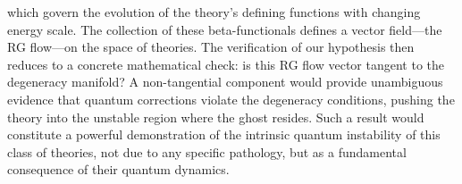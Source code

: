 \documentclass[twocolumn]{aastex631}
\begin{document}
which govern the evolution of the theory's defining functions with changing energy scale. The collection of these beta-functionals defines a vector field---the RG flow---on the space of theories. The verification of our hypothesis then reduces to a concrete mathematical check: is this RG flow vector tangent to the degeneracy manifold? A non-tangential component would provide unambiguous evidence that quantum corrections violate the degeneracy conditions, pushing the theory into the unstable region where the ghost resides. Such a result would constitute a powerful demonstration of the intrinsic quantum instability of this class of theories, not due to any specific pathology, but as a fundamental consequence of their quantum dynamics.
\end{document}
